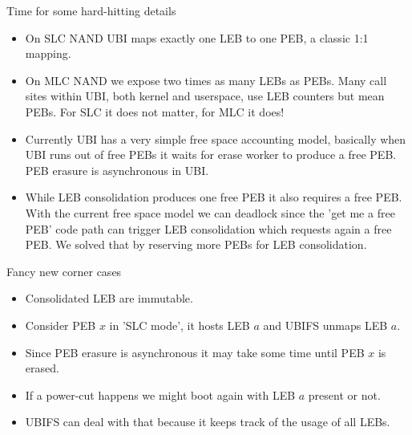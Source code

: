 \documentclass[aspectratio=169,obeyspaces,spaces,hyphens,dvipsnames]{beamer}
\begin{document}
\begin{frame}{Time for some hard-hitting details}
  \begin{itemize}
  \item On SLC NAND UBI maps exactly one LEB to one PEB, a classic 1:1 mapping.
  \item On MLC NAND we expose two times as many LEBs as PEBs. Many call sites within UBI,
        both kernel and userspace, use LEB counters but mean PEBs. For SLC it does not matter, for MLC it does!
  \item Currently UBI has a very simple free space accounting model, basically when UBI runs out of
        free PEBs it waits for erase worker to produce a free PEB. PEB erasure is asynchronous in UBI.
  \item While LEB consolidation produces one free PEB it also requires a free PEB. With the current free space
        model we can deadlock since the 'get me a free PEB' code path can trigger LEB consolidation which
        requests again a free PEB. We solved that by reserving more PEBs for LEB consolidation. 
  \end{itemize}
\end{frame}

\begin{frame}{Fancy new corner cases}
  \begin{itemize}
  \item Consolidated LEB are immutable.
  \item Consider PEB $x$ in 'SLC mode', it hosts LEB $a$ and UBIFS unmaps LEB $a$.
  \item Since PEB erasure is asynchronous it may take some time until PEB $x$ is erased.
  \item If a power-cut happens we might boot again with LEB $a$ present or not.
  \item UBIFS can deal with that because it keeps track of the usage of all LEBs.
  \end{itemize}
\end{frame}
\end{document}
